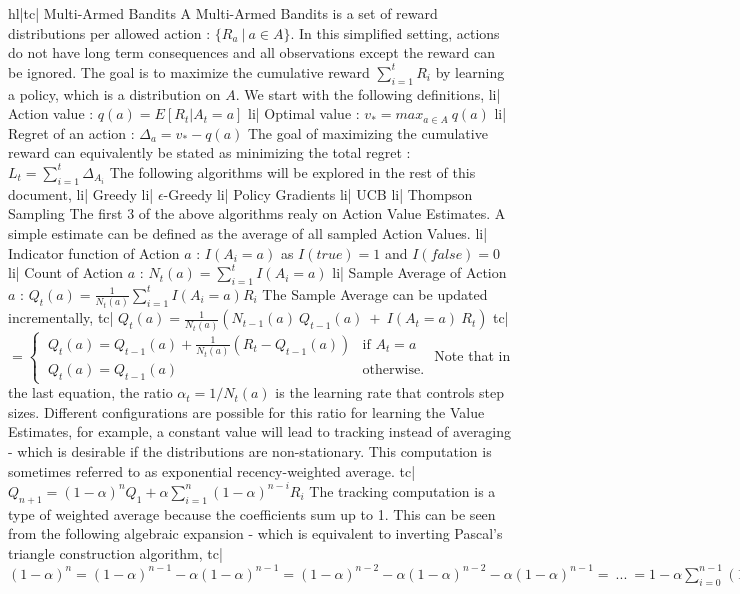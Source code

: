 hl|tc| Multi-Armed Bandits
A Multi-Armed Bandits is a set of reward distributions per allowed action : \( \{ R_a \ | \ a \in A \} \). In this simplified setting, actions do not have long term consequences and all observations except the reward can be ignored. The goal is to maximize the cumulative reward \( \sum_{i=1}^t R_i \) by learning a policy, which is a distribution on \( A \). We start with the following definitions,
li| Action value : \( q(a) = E[R_t | A_t = a] \)
li| Optimal value : \( v_* = max_{a \in A} \ q(a) \)
li| Regret of an action : \( \Delta_a = v_* - q(a) \)
The goal of maximizing the cumulative reward can equivalently be stated as minimizing the total regret : \( L_t = \sum_{i=1}^t \Delta_{A_i} \)
The following algorithms will be explored in the rest of this document,
li| Greedy
li| \(\epsilon\)-Greedy
li| Policy Gradients
li| UCB
li| Thompson Sampling
The first 3 of the above algorithms realy on Action Value Estimates. A simple estimate can be defined as the average of all sampled Action Values.
li| Indicator function of Action \(a\) : \( I(A_i = a) \) as \( I(true) = 1 \) and \( I(false) = 0 \)
li| Count of Action \(a\) : \( N_t(a) = \sum_{i=1}^t I(A_i = a) \)
li| Sample Average of Action \(a\) : \( Q_t(a) = \frac{1}{N_t(a)} \sum_{i=1}^t I(A_i = a) R_i \)
The Sample Average can be updated incrementally,
tc| \( Q_t(a) = \frac{1}{N_{t}(a)} (N_{t-1}(a) \ Q_{t-1}(a) \ + \ I(A_t = a) \ R_t ) \)
tc| \( = \begin{cases} \ Q_t(a) = Q_{t-1}(a) + \frac{1}{N_t(a)}(R_t - Q_{t-1}(a)) & \text{if } A_t=a \\ \ Q_t(a) = Q_{t-1}(a) & \text{otherwise.} \end{cases} \)
Note that in the last equation, the ratio \( \alpha_t = 1/N_t(a) \) is the learning rate that controls step sizes. Different configurations are possible for this ratio for learning the Value Estimates, for example, a constant value will lead to tracking instead of averaging - which is desirable if the distributions are non-stationary. This computation is sometimes referred to as exponential recency-weighted average.
tc| \( Q_{n+1} = (1 - \alpha)^n Q_1 + \alpha \sum_{i=1}^{n} (1 - \alpha)^{n - i} R_i \)
The tracking computation is a type of weighted average because the coefficients sum up to 1. This can be seen from the following algebraic expansion - which is equivalent to inverting Pascal's triangle construction algorithm,
tc| \( (1 - \alpha)^n = (1 - \alpha)^{n - 1} - \alpha (1 - \alpha)^{n - 1} = (1 - \alpha)^{n - 2} - \alpha (1 - \alpha)^{n - 2} - \alpha (1 - \alpha)^{n - 1} = \ ... \ = 1 - \alpha \sum_{i = 0}^{n - 1} (1 - \alpha)^i \)
